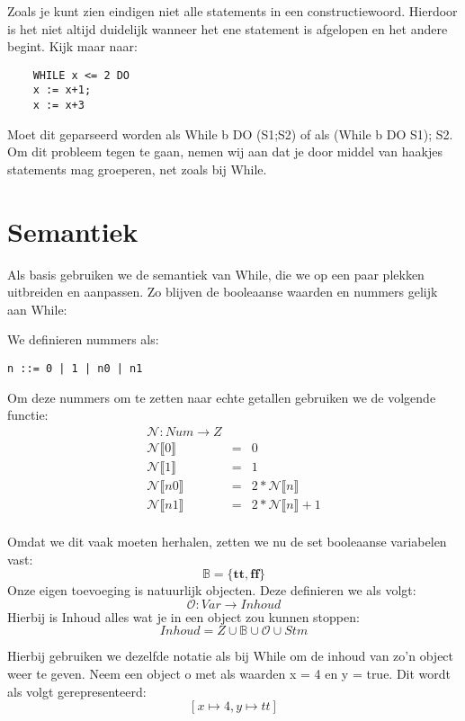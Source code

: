 \documentclass[12pt]{article}
\begin{document}
Zoals je kunt zien eindigen niet alle statements in een constructiewoord. Hierdoor is het niet altijd duidelijk wanneer het ene statement is afgelopen en het andere begint. Kijk maar naar:
\begin{lstlisting}
	WHILE x <= 2 DO
	x := x+1;
	x := x+3
\end{lstlisting}
Moet dit geparseerd worden als While b DO (S1;S2) of als (While b DO S1); S2. Om dit probleem tegen te gaan, nemen wij aan dat je door middel van haakjes statements mag groeperen, net zoals bij While.
\pagebreak
\section{Semantiek}

Als basis gebruiken we de semantiek van While, die we op een paar plekken uitbreiden en aanpassen.
Zo blijven de booleaanse waarden en nummers gelijk aan While:

We definieren nummers als:
\begin{lstlisting}
n ::= 0 | 1 | n0 | n1
\end{lstlisting}

Om deze nummers om te zetten naar echte getallen gebruiken we de volgende functie:
$$
\begin{matrix}
\mathcal{N}: Num \rightarrow Z \\
\mathcal{N}\llbracket 0 \rrbracket &= &0  \\
\mathcal{N}\llbracket 1 \rrbracket &= &1 \\
\mathcal{N}\llbracket n0 \rrbracket &= &2 * \mathcal{N}\llbracket n \rrbracket \\
\mathcal{N}\llbracket n1 \rrbracket &= &2 * \mathcal{N}\llbracket n \rrbracket + 1 \\
\end{matrix}
$$

Omdat we dit vaak moeten herhalen, zetten we nu de set booleaanse variabelen vast:
$$ \mathds{B} = \{\boldsymbol{tt},\boldsymbol{ff}\} $$
Onze eigen toevoeging is natuurlijk objecten. Deze definieren we als volgt:
$$\mathcal{O} : Var \rightarrow Inhoud$$ 
Hierbij is Inhoud alles wat je in een object zou kunnen stoppen: 
$$Inhoud = Z \cup \mathds{B} \cup \mathcal{O} \cup Stm$$ 

Hierbij gebruiken we dezelfde notatie als bij While om de inhoud van zo'n object weer te geven.
Neem een object o met als waarden x = 4 en y = true. Dit wordt als volgt gerepresenteerd:
$$[x \mapsto 4, y \mapsto tt]$$
\end{document}
